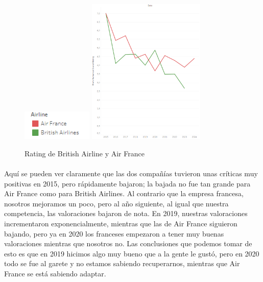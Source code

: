 \documentclass{report}
\begin{document}
            \begin{figure}[H]
                \centering
                \includegraphics[width=0.3\textwidth]{img/Guion5.png}
                \includegraphics[width=0.5\textwidth]{img/Rating.png}
                \caption{Rating de British Airline y Air France}
            \end{figure}
                                                         
            \paragraph*{}{
            Aquí se pueden ver claramente que las dos compañías tuvieron unas críticas muy positivas en 2015, pero rápidamente bajaron; la bajada no fue tan grande para Air France como para British Airlines. Al contrario que la empresa francesa, nosotros mejoramos un poco, pero al año siguiente, al igual que nuestra competencia, las valoraciones bajaron de nota. En 2019, nuestras valoraciones incrementaron exponencialmente, mientras que las de Air France siguieron bajando, pero ya en 2020 los franceses empezaron a tener muy buenas valoraciones mientras que nosotros no. Las conclusiones que podemos tomar de esto es que en 2019 hicimos algo muy bueno que a la gente le gustó, pero en 2020 todo se fue al garete y no estamos sabiendo recuperarnos, mientras que Air France se está sabiendo adaptar.
            }
\end{document}
